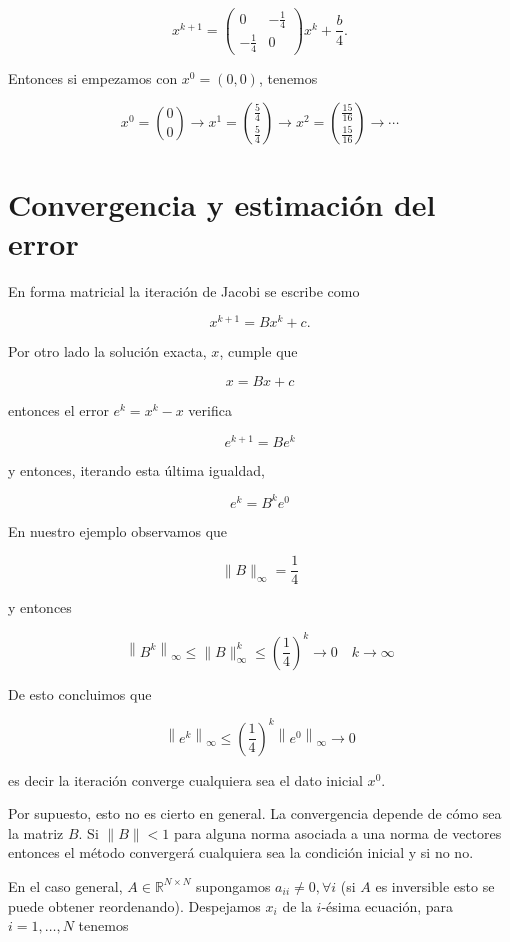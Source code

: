 \documentclass[10pt]{book}
\begin{document}
$$
x^{k+1}=\left(\begin{array}{cc}
0 & -\frac{1}{4} \\
-\frac{1}{4} & 0
\end{array}\right) x^{k}+\frac{b}{4} .
$$

Entonces si empezamos con $x^{0}=(0,0)$, tenemos

$$
x^{0}=\binom{0}{0} \rightarrow x^{1}=\binom{\frac{5}{4}}{\frac{5}{4}} \rightarrow x^{2}=\binom{\frac{15}{16}}{\frac{15}{16}} \rightarrow \cdots
$$

\section*{Convergencia y estimación del error}
En forma matricial la iteración de Jacobi se escribe como

$$
x^{k+1}=B x^{k}+c .
$$

Por otro lado la solución exacta, $x$, cumple que

$$
x=B x+c
$$

entonces el error $e^{k}=x^{k}-x$ verifica

$$
e^{k+1}=B e^{k}
$$

y entonces, iterando esta última igualdad,

$$
e^{k}=B^{k} e^{0}
$$

En nuestro ejemplo observamos que

$$
\|B\|_{\infty}=\frac{1}{4}
$$

y entonces

$$
\left\|B^{k}\right\|_{\infty} \leq\|B\|_{\infty}^{k} \leq\left(\frac{1}{4}\right)^{k} \rightarrow 0 \quad k \rightarrow \infty
$$

De esto concluimos que

$$
\left\|e^{k}\right\|_{\infty} \leq\left(\frac{1}{4}\right)^{k}\left\|e^{0}\right\|_{\infty} \rightarrow 0
$$

es decir la iteración converge cualquiera sea el dato inicial $x^{0}$.

Por supuesto, esto no es cierto en general. La convergencia depende de cómo sea la matriz $B$. Si $\|B\|<1$ para alguna norma asociada a una norma de vectores entonces el método convergerá cualquiera sea la condición inicial y si no no.

En el caso general, $A \in \mathbb{R}^{N \times N}$ supongamos $a_{i i} \neq 0, \forall i$ (si $A$ es inversible esto se puede obtener reordenando). Despejamos $x_{i}$ de la $i$-ésima ecuación, para $i=1, \ldots, N$ tenemos
\end{document}

